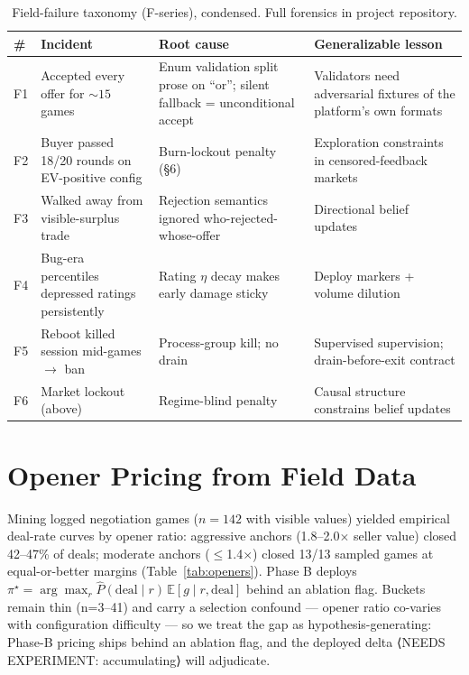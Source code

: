 \documentclass[11pt]{article}
\begin{document}
\begin{table}[t]\centering\small
\caption{Field-failure taxonomy (F-series), condensed. Full forensics in project repository.}
\label{tab:failures}
\begin{tabular}{p{0.5cm}p{3.6cm}p{4.6cm}p{5.2cm}}
\toprule
\# & Incident & Root cause & Generalizable lesson \\
\midrule
F1 & Accepted every offer for ${\sim}15$ games & Enum validation split prose on ``or''; silent fallback = unconditional accept & Validators need adversarial fixtures of the platform's own formats \\
F2 & Buyer passed 18/20 rounds on EV-positive config & Burn-lockout penalty (\S6) & Exploration constraints in censored-feedback markets \\
F3 & Walked away from visible-surplus trade & Rejection semantics ignored who-rejected-whose-offer & Directional belief updates \\
F4 & Bug-era percentiles depressed ratings persistently & Rating $\eta$ decay makes early damage sticky & Deploy markers + volume dilution \\
F5 & Reboot killed session mid-games $\to$ ban & Process-group kill; no drain & Supervised supervision; drain-before-exit contract \\
F6 & Market lockout (above) & Regime-blind penalty & Causal structure constrains belief updates \\
\bottomrule
\end{tabular}
\end{table}

\section{Opener Pricing from Field Data}
Mining logged negotiation games ($n{=}142$ with visible values) yielded empirical deal-rate curves by opener ratio: aggressive anchors (1.8--2.0$\times$ seller value) closed 42--47\% of deals; moderate anchors ($\le$1.4$\times$) closed 13/13 sampled games at equal-or-better margins (Table~\ref{tab:openers}). Phase B deploys $\pi^\star = \arg\max_r \widehat{P}(\mathrm{deal}\mid r)\,\mathbb{E}[g \mid r,\mathrm{deal}]$ behind an ablation flag. Buckets remain thin (n=3--41) and carry a selection confound --- opener
ratio co-varies with configuration difficulty --- so we treat the gap as
hypothesis-generating: Phase-B pricing ships behind an ablation flag, and the
deployed delta ⟨NEEDS EXPERIMENT: accumulating⟩ will adjudicate.
\end{document}
